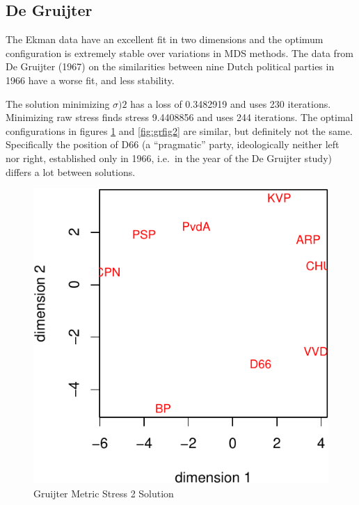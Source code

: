 \documentclass[
  12pt,
]{article}
\theoremstyle{definition}
\theoremstyle{definition}
\theoremstyle{definition}
\theoremstyle{definition}
\theoremstyle{remark}
\begin{document}
\subsection{De Gruijter}\label{de-gruijter}

The Ekman data have an excellent fit in two dimensions and the optimum configuration is
extremely stable over variations in MDS methods. The data from De Gruijter (1967) on the
similarities between nine Dutch political parties in 1966 have a worse fit, and
less stability.

The solution minimizing \(\sigma)2\) has a loss of 0.3482919 and uses 230 iterations.
Minimizing raw stress finds stress 9.4408856 and uses 244 iterations. The optimal
configurations in figures \ref{fig:grfig1} and \ref{fig:grfig2} are similar, but definitely
not the same. Specifically the position of D66 (a ``pragmatic'' party, ideologically neither left nor right, established only in 1966, i.e.~in the year of the De Gruijter study) differs a lot between solutions.

\begin{figure}

{\centering \includegraphics{stress2_files/figure-latex/grfig1-1} 

}

\caption{Gruijter Metric Stress 2 Solution}\label{fig:grfig1}
\end{figure}
\end{document}
